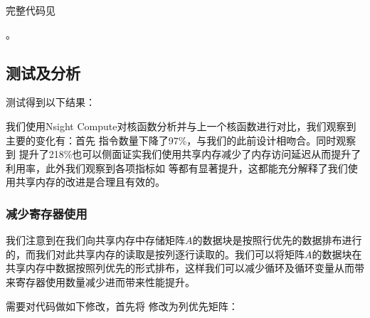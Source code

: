 \documentclass[letterpaper,10pt,english]{sphinxmanual}
\begin{document}
\sphinxAtStartPar
完整代码见%
\begin{footnote}[31]\sphinxAtStartFootnote
{}
%
\end{footnote}。


\subsection{测试及分析}
\label{\detokenize{chapter_accelerator/accelerator_practise:id12}}
\sphinxAtStartPar
测试得到以下结果：

\begin{sphinxVerbatim}[commandchars=\\\{\}]
  
       
\end{sphinxVerbatim}

\sphinxAtStartPar
我们使用Nsight
Compute对核函数分析并与上一个核函数进行对比，我们观察到主要的变化有：首先
 指令数量下降了97\%，与我们的此前设计相吻合。同时观察到
提升了218\%也可以侧面证实我们使用共享内存减少了内存访问延迟从而提升了利用率，此外我们观察到各项指标如
等都有显著提升，这都能充分解释了我们使用共享内存的改进是合理且有效的。


\subsubsection{减少寄存器使用}
\label{\detokenize{chapter_accelerator/accelerator_practise:id13}}\label{\detokenize{chapter_accelerator/accelerator_practise:id14}}
\sphinxAtStartPar
我们注意到在我们向共享内存中存储矩阵\(A\)的数据块是按照行优先的数据排布进行的，而我们对此共享内存的读取是按列逐行读取的。我们可以将矩阵\(A\)的数据块在共享内存中数据按照列优先的形式排布，这样我们可以减少循环及循环变量从而带来寄存器使用数量减少进而带来性能提升。

\sphinxAtStartPar
需要对代码做如下修改，首先将  修改为列优先矩阵：

\begin{sphinxVerbatim}[commandchars=\\\{\}]
\PYG{p}{[}\PYG{p}{]}\PYG{p}{[}\PYG{p}{]}
\end{sphinxVerbatim}
\end{document}
